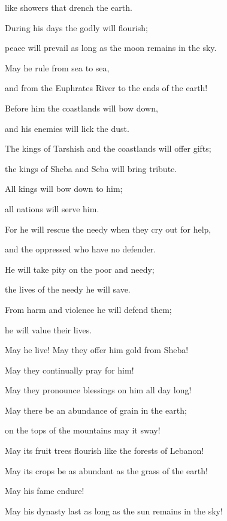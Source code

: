 {\par }{\Q like showers
that drench
the earth.
\par }{\Q {}During
his days
the godly
will flourish;
\par }{\Q peace
will prevail as long as
the moon
remains in the sky.
\par }{\Q {}May he rule
from sea
to
sea,
\par }{\Q and from the Euphrates
River to
the ends
of the earth!
\par }{\Q {}Before
him the coastlands
will bow down,
\par }{\Q and his enemies
will lick
the dust.
\par }{\Q {}The kings
of Tarshish
and the coastlands
will offer
gifts;
\par }{\Q the kings
of Sheba
and Seba
will bring
tribute.
\par }{\Q {}All
kings
will bow
down to him;
\par }{\Q all
nations
will serve him.
\par }{\Q {}For
he will rescue
the needy
when they cry out
for help,
\par }{\Q and the oppressed
who have no defender.
\par }{\Q {}He will take pity
on
the poor
and needy;
\par }{\Q the lives
of the needy
he will save.
\par }{\Q {}From harm
and violence
he will defend
them;

\par }{\Q he will value
their lives.
\par }{\Q {}May he live! May they offer
him gold
from Sheba!

\par }{\Q May they continually
pray
for
him!
\par }{\Q May they pronounce blessings
on him all
day long!
\par }{\Q {}May there be
an abundance
of grain
in the earth;
\par }{\Q on the tops
of the mountains
may it
sway!

\par }{\Q May
its fruit
trees flourish
like the forests of Lebanon!

\par }{\Q May
its crops be as abundant as the grass
of the earth!
\par }{\Q {}May
his fame
endure!

\par }{\Q May his dynasty last
as long as
the sun
remains in the sky!

}
